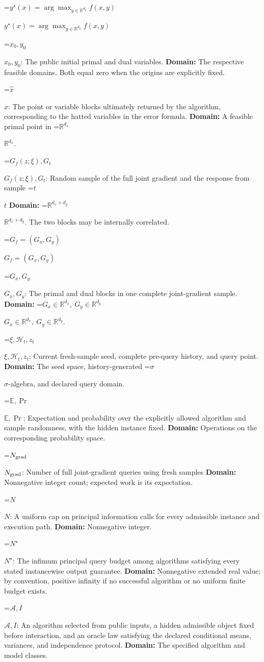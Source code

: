 \documentclass[10pt,a4paper]{article}
\newcommand{\AtlasMath}[1]{\par\begingroup\centering\setbox0=\hbox{$\displaystyle #1$}\ifdim\wd0>1.4\linewidth\typeout{ATLAS WIDE FORMULA: \the\wd0}\fi\ifdim\wd0>\linewidth\resizebox{\linewidth}{!}{\box0}\else\box0\fi\par\endgroup}
\newcommand{\AtlasInlineMath}[1]{\begingroup\setbox0=\hbox{$#1$}\ifdim\wd0>.4\linewidth\endgroup\AtlasMath{#1}\else\endgroup$#1$\fi}
\begin{document}
\AtlasInlineMath{y^\star(x)=\arg\max_{y\in\mathbb R^{d_y}}f(x,y)}

\AtlasInlineMath{x_0,y_0}: The public initial primal and dual variables. \textbf{Domain:} The respective feasible domains. Both equal zero when the origins are explicitly fixed.

\AtlasInlineMath{\widehat x}: The point or variable blocks ultimately returned by the algorithm, corresponding to the hatted variables in the error formula. \textbf{Domain:} A feasible primal point in \AtlasInlineMath{\mathbb R^{d_x}}.

\AtlasInlineMath{G_f(z;\xi),G_t}: Random sample of the full joint gradient and the response from sample \AtlasInlineMath{t} \textbf{Domain:} \AtlasInlineMath{\mathbb R^{d_x+d_y}}. The two blocks may be internally correlated.

\AtlasInlineMath{G_f=(G_x,G_y)}

\AtlasInlineMath{G_x,G_y}: The primal and dual blocks in one complete joint-gradient sample. \textbf{Domain:} \AtlasInlineMath{G_x\in\mathbb R^{d_x},\ G_y\in\mathbb R^{d_y}}.

\AtlasInlineMath{\xi,\mathcal H_t,z_t}: Current fresh-sample seed, complete pre-query history, and query point. \textbf{Domain:} The seed space, history-generated \AtlasInlineMath{\sigma}-algebra, and declared query domain.

\AtlasInlineMath{\mathbb E,\Pr}: Expectation and probability over the explicitly allowed algorithm and sample randomness, with the hidden instance fixed. \textbf{Domain:} Operations on the corresponding probability space.

\AtlasInlineMath{N_{\rm grad}}: Number of full joint-gradient queries using fresh samples \textbf{Domain:} Nonnegative integer count; expected work is its expectation.

\AtlasInlineMath{N}: A uniform cap on principal information calls for every admissible instance and execution path. \textbf{Domain:} Nonnegative integer.

\AtlasInlineMath{N^\star}: The infimum principal query budget among algorithms satisfying every stated instancewise output guarantee. \textbf{Domain:} Nonnegative extended real value; by convention, positive infinity if no successful algorithm or no uniform finite budget exists.

\AtlasInlineMath{\mathcal A,I}: An algorithm selected from public inputs, a hidden admissible object fixed before interaction, and an oracle law satisfying the declared conditional means, variances, and independence protocol. \textbf{Domain:} The specified algorithm and model classes.
\end{document}
